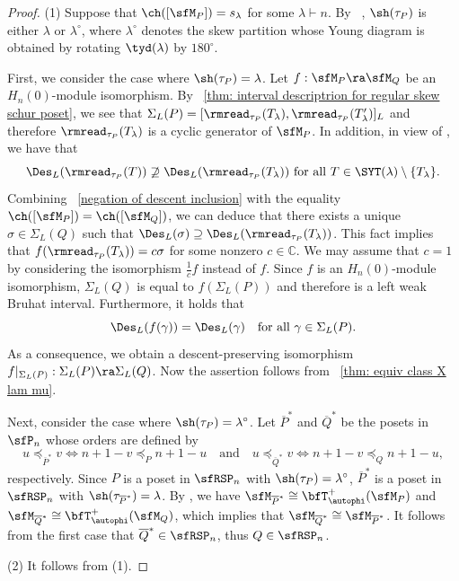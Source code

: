\documentclass[12pt, reqno]{amsart}
\theoremstyle{definition}
\numberwithin{equation}{section} \numberwithin{figure}{section}
\numberwithin{table}{section}
\def\C{\mathbb C}
\begin{document}
\begin{proof}
(1) Suppose that $\ch([\sfM_P]) = s_{\lambda}$ for some $\lambda \vdash n$.
By ~\cite[Theorem 2.2]{05W}, $\sh(\tau_P)$ is either $\lambda$ or $\lambda^\circ$, where $\lambda^\circ$ denotes the skew partition whose Young diagram is obtained by rotating $\tyd(\lambda)$ by $180^\circ$.

First, we consider the case where $\sh(\tau_P) = \lambda$.
Let $f: \sfM_P \ra \sfM_Q$ be an $H_n(0)$-module isomorphism.
By ~\cref{thm: interval descriptrion for regular skew schur poset},
we see that 
$\Sigma_L(P) = [\rmread_{\tau_P} (T_{\lambda}), \rmread_{\tau_P}(T'_{\lambda})]_L$ and therefore $\rmread_{\tau_P} (T_{\lambda})$ is a cyclic generator of $\sfM_P$.
In addition, in view of \cite[Lemma 3.12]{19Searles}, we have that 
\begin{equation}\label{negation of descent inclusion}
\Des_L(\rmread_{\tau_P}(T)) \not\supseteq \Des_L(\rmread_{\tau_P}(T_{\lambda}))
\text{ for all $T \in \SYT(\lambda) \setminus \{T_{\lambda} \}$.}
\end{equation}
Combining ~\eqref{negation of descent inclusion} with the equality $\ch([\sfM_P]) = \ch([\sfM_Q])$, we can deduce  that there exists a unique $\sigma \in \Sigma_L(Q)$ such that $\Des_L(\sigma) \supseteq \Des_L(\rmread_{\tau_P}(T_{\lambda}))$.
This fact implies that  $f(\rmread_{\tau_P}(T_{\lambda})) = c \sigma$ for some nonzero $c \in \C$.
We may assume that $c = 1$ by considering the isomorphism $\frac{1}{c}f$ instead of $f$. 
Since $f$ is an $H_n(0)$-module isomorphism,
$\Sigma_L(Q)$ is equal to $f(\Sigma_L(P))$ and therefore is a left weak Bruhat interval. Furthermore, it holds that   
\[
\Des_L(f(\gamma)) = \Des_L(\gamma) \quad \text{for all $\gamma \in \Sigma_L(P)$.}
\]
As a consequence, we obtain a descent-preserving isomorphism $f|_{\Sigma_L(P)}: \Sigma_L(P) \ra \Sigma_L(Q)$.
Now the assertion follows from  ~\cref{thm: equiv class X lam mu}.

Next, consider the case where $\sh(\tau_P) = \lambda^\circ$.
Let $\overline{P}^*$ and $\overline{Q}^*$ be the posets in $\sfP_n$ whose orders are defined by 
\[
u \preceq_{\overline{P}^*} v
\Longleftrightarrow 
n + 1 - v \preceq_P n + 1 - u
\quad \text{and} \quad
u \preceq_{\overline{Q}^*} v
\Longleftrightarrow 
n + 1 - v \preceq_Q n + 1 - u,
\]
respectively.
Since $P$ is a poset in $\sfRSP_n$ with $\sh(\tau_P) = \lambda^\circ$,  $\overline{P}^*$ is a poset in $\sfRSP_n$ with $\sh(\tau_{\overline{P}^*}) = \lambda$.
By \cite[Theorem 3.6(a)]{23CKO}, we have $\sfM_{\overline{P}^*} \cong \bfT^+_{\autophi} (\sfM_{P})$ and $\sfM_{\overline{Q}^*} \cong \bfT^+_{\autophi} (\sfM_{Q})$, which implies that $\sfM_{\overline{Q}^*} \cong \sfM_{\overline{P}^*}$.
It follows from the first case that $\overline{Q}^* \in \sfRSP_n$, thus $Q \in \sfRSP_n$.


(2) It follows from (1).
\end{proof}
\end{document}

